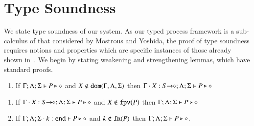 \section{Type Soundness}\label{app:ts}
We state type soundness of our system.
As our typed process framework is a sub-calculus of that considered by Mostrous and Yoshida, the proof of type soundness requires notions and properties which are specific instances of those already shown in~\cite{}.
We begin by stating weakening and strengthening lemmas, which have standard proofs.



\begin{lemma}\label{l:weak}
\begin{enumerate}[$-$]
\item If $\Gamma; \Lambda; \Sigma   \vdash P \triangleright \diamond$ and $X \not\in \mathtt{dom}(\Gamma,\Lambda,\Sigma)$ then $\Gamma\cdot X: S\!\! \rightarrow\!\! \diamond; \Lambda; \Sigma   \vdash P \triangleright \diamond$ 
\end{enumerate}
\end{lemma}

\begin{lemma}\label{l:stren}
\begin{enumerate}[$-$]
\item If $\Gamma \cdot X: S\!\! \rightarrow\!\! \diamond; \Lambda; \Sigma   \vdash P \triangleright \diamond$ and $X \not\in \mathtt{fpv}(P)$ then $\Gamma; \Lambda; \Sigma   \vdash P \triangleright \diamond$ 
\item If $\Gamma; \Lambda; \Sigma \cdot k: \mathtt{end}  \vdash P \triangleright \diamond$ and $k \not\in \mathtt{fn}(P)$ then $\Gamma; \Lambda; \Sigma \vdash P \triangleright \diamond$.
\end{enumerate}
\end{lemma}

